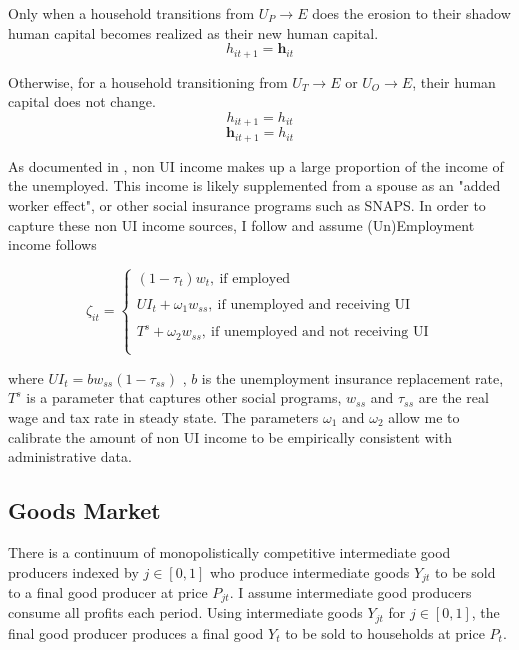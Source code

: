 Only when a household transitions from $U_{P} \rightarrow E$ does the erosion to their shadow human capital becomes realized as their new human capital.
$$ h_{it+1}  = \mathbf{h}_{it}  $$


Otherwise, for a household transitioning from $U_{T} \rightarrow E$ or  $U_{O} \rightarrow E$, their human capital does not change.
 $$h_{it+1} = h_{it}$$
$$\mathbf{h}_{it+1} = h_{it}$$

    
As documented in \cite{kekre2023}, non UI income makes up a large proportion of the income of the unemployed. This income is likely supplemented from a spouse as an "added worker effect", or other social insurance programs such as SNAPS.  In order to capture these non UI income sources, I follow \cite{kekre2023} and assume (Un)Employment income follows   

$$
\zeta _{it} =
\begin{cases}
(1-\tau_{t}) w_{t} , \  \text{if employed}\\ \\
UI_{t} +\omega_{1}w_{ss}, \  \text{if unemployed and receiving UI } \\ \\
T^{s} + \omega_{2}w_{ss}, \ \text{if unemployed and not receiving UI} \\ \\
\end{cases}
$$ 
\vspace{.2cm}

where $UI_{t} = b w_{ss} (1-\tau_{ss})$ ,  $b$ is the unemployment insurance replacement rate, $T^{s}$  is a parameter that captures other social programs, $w_{ss}$ and $\tau_{ss}$ are the real wage and tax rate in steady state. The parameters $\omega_{1}$ and $\omega_{2}$ allow me to calibrate the amount of non UI income to be empirically consistent with administrative data.  











\hypertarget{Goods Market}{}
\subsection{Goods Market}

There is a continuum of  monopolistically competitive intermediate good producers indexed by $j \in [0,1]$ who produce intermediate goods $Y_{jt}$ to be sold to a final good producer at price $P_{jt}$. I assume intermediate good producers consume all profits each period. Using intermediate goods $Y_{jt}$ for $j \in [0,1]$, the  final good producer produces a final good $Y_{t}$ to be sold to households at price $P_{t}$.  \\ 


